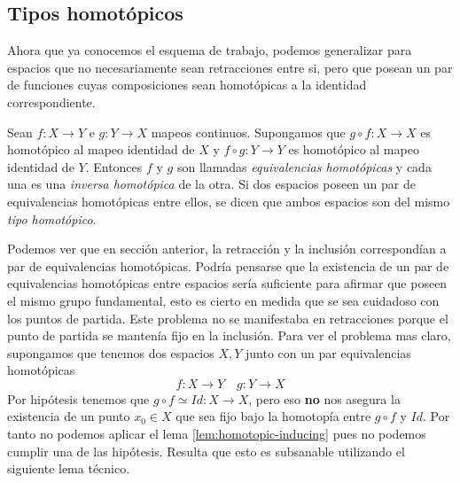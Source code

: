 \subsection{Tipos homotópicos}
Ahora que ya conocemos el esquema de trabajo, podemos generalizar para
espacios que no necesariamente sean retracciones entre si, pero que
posean un par de funciones cuyas composiciones sean homotópicas a la
identidad correspondiente.
\begin{definicion} \label{def:equivalencias-hom}
  Sean \(f : X \to Y\) e \(g : Y \to X\) mapeos continuos. Supongamos
  que \( g \circ f : X \to X \) es homotópico al mapeo identidad de
  \(X\) y \( f \circ g : Y \to Y \) es homotópico al mapeo identidad de
  \(Y\). Entonces \(f\) y \(g\) son llamadas \emph{equivalencias
  homotópicas} y cada una es una \emph{inversa homotópica} de la otra.
  Si dos espacios poseen un par de equivalencias homotópicas entre ellos,
  se dicen que ambos espacios son del mismo \emph{tipo homotópico}.
\end{definicion}
Podemos ver que en sección anterior, la retracción y la inclusión
correspondían a par de equivalencias homotópicas. Podría pensarse que la
existencia de un par de equivalencias homotópicas entre espacios sería
suficiente para afirmar que poseen el mismo grupo fundamental, esto es
cierto en medida que se sea cuidadoso con los puntos de partida. Este
problema no se manifestaba en retracciones porque el punto de partida se
mantenía fijo en la inclusión. Para ver el problema mas claro,
supongamos que tenemos dos espacios \(X, Y\) junto con un par
equivalencias homotópicas
\[ f : X \to Y \quad g : Y \to X \]
Por hipótesis tenemos que \(g \circ f \simeq Id : X \to X\), pero eso
\textbf{no} nos asegura la existencia de un punto \(x_0 \in X\) que sea
fijo bajo la homotopía entre \( g \circ f\) y \(Id\). Por tanto no
podemos aplicar el lema \ref{lem:homotopic-inducing} pues no podemos
cumplir una de las hipótesis. Resulta que esto es subsanable utilizando
el siguiente lema técnico.

